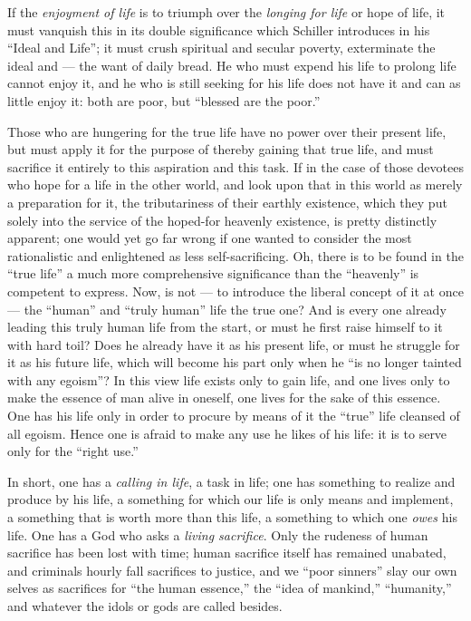 If the \textit{enjoyment of life} is to triumph over the \textit{longing for 
life} or hope of life, it must vanquish this in its double significance which 
Schiller introduces in his ``Ideal and Life''; it must crush spiritual and 
secular poverty, exterminate the ideal and --- the want of daily bread. He who 
must expend his life to prolong life cannot enjoy it, and he who is still 
seeking for his life does not have it and can as little enjoy it: both are 
poor, but ``blessed are the poor.''

Those who are hungering for the true life have no power over their present 
life, but must apply it for the purpose of thereby gaining that true life, and 
must sacrifice it entirely to this aspiration and this task. If in the case of 
those devotees who hope for a life in the other world, and look upon that in 
this world as merely a preparation for it, the tributariness of their earthly 
existence, which they put solely into the service of the hoped-for heavenly 
existence, is pretty distinctly apparent; one would yet go far wrong if one 
wanted to consider the most rationalistic and enlightened as less 
self-sacrificing. Oh, there is to be found in the ``true life'' a much more 
comprehensive significance than the ``heavenly'' is competent to express. 
Now, is not --- to introduce the liberal concept of it at once --- the 
``human'' and ``truly human'' life the true one? And is every one already 
leading this truly human life from the start, or must he first raise himself 
to it with hard toil? Does he already have it as his present life, or must he 
struggle for it as his future life, which will become his part only when he 
``is no longer tainted with any egoism''? In this view life exists only to 
gain life, and one lives only to make the essence of man alive in oneself, one 
lives for the sake of this essence. One has his life only in order to procure 
by means of it the ``true'' life cleansed of all egoism. Hence one is afraid 
to make any use he likes of his life: it is to serve only for the ``right 
use.''

In short, one has a \textit{calling in life}, a task in life; one has 
something to realize and produce by his life, a something for which our life 
is only means and implement, a something that is worth more than this life, a 
something to which one \textit{owes} his life. One has a God who asks a 
\textit{living sacrifice}. Only the rudeness of human sacrifice has been lost 
with time; human sacrifice itself has remained unabated, and criminals hourly 
fall sacrifices to justice, and we ``poor sinners'' slay our own selves as 
sacrifices for ``the human essence,'' the ``idea of mankind,'' 
``humanity,'' and whatever the idols or gods are called besides.

